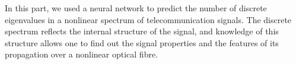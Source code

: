 In this part, we used a neural network to predict the number of discrete eigenvalues in a nonlinear spectrum of telecommunication signals. The discrete spectrum reflects the internal structure of the signal, and knowledge of this structure allows one to find out the signal properties and the features of its propagation over a nonlinear optical fibre.



\begin{figure}[htpb]
    \begin{minipage}[h]{0.5\linewidth}
    \end{minipage}
    \hfill
    \begin{minipage}[h]{0.5\linewidth}
\end{minipage}
\end{figure}
